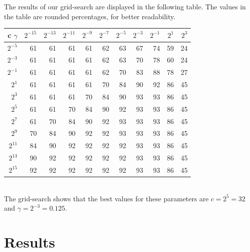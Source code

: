 \documentclass[a4paper]{article}
\begin{document}
The results of our grid-search are displayed in the following table. The values
in the table are rounded percentages, for better readability.

\begin{tabular}{|r|r r r r r r r r r r|}
\hline
c $\gamma$ & $2^{-15}$ & $2^{-13}$ & $2^{-11}$ & $2^{-9}$ & $2^{-7}$ &
	$2^{-5}$ & $2^{-3}$ & $2^{-1}$ & $2^{1}$ & $2^{3}$\\
\hline
$2^{-5}$ &       61 &       61 &       61 &       61 &       62 &
       63 &       67 &       74 &       59 &       24\\
$2^{-3}$ &       61 &       61 &       61 &       61 &       62 &
       63 &       70 &       78 &       60 &       24\\
$2^{-1}$ &       61 &       61 &       61 &       61 &       62 &
       70 &       83 &       88 &       78 &       27\\
 $2^{1}$ &       61 &       61 &       61 &       61 &       70 &
        84 &       90 &       92 &       86 &       45\\
 $2^{3}$ &       61 &       61 &       61 &       70 &       84 &
        90 &       93 &       93 &       86 &       45\\
 $2^{5}$ &       61 &       61 &       70 &       84 &       90 &
        92 &       93 &       93 &       86 &       45\\
 $2^{7}$ &       61 &       70 &       84 &       90 &       92 &
        93 &       93 &       93 &       86 &       45\\
 $2^{9}$ &       70 &       84 &       90 &       92 &       92 &
       93 &       93 &       93 &       86 &       45\\
$2^{11}$ &       84 &       90 &       92 &       92 &       92 &
       92 &       93 &       93 &       86 &       45\\
$2^{13}$ &       90 &       92 &       92 &       92 &       92 &
       92 &       93 &       93 &       86 &       45\\
$2^{15}$ &       92 &       92 &       92 &       92 &       92 &
       92 &       93 &       93 &       86 &       45\\
\hline
\end{tabular} \\

The grid-search shows that the best values for these parameters are $c = 2^5 =
32$ and $\gamma = 2^{-3} = 0.125$.

\section{Results}
\end{document}
